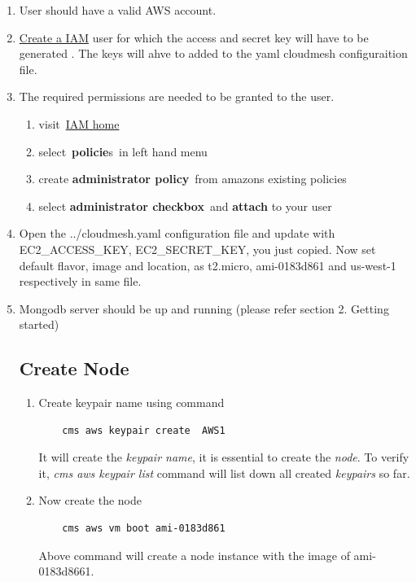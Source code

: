 \documentclass[9pt,twocolumn,twoside]{../../styles/osajnl}
\begin{document}
\begin{enumerate}
	\item User should have a valid AWS account.
	\item \href{https://console.aws.amazon.com/iam/home?#/users}{Create a IAM}  user for which the access and secret key will have to be generated \cite{www-attach-policy}. The keys will ahve to added to the yaml cloudmesh configuraition file.
	
	\item The required permissions are needed to be granted to the user.
		\begin{enumerate}
			
			\item visit \href{https://console.aws.amazon.com/iam/home} {IAM home}
			\item select \textbf{policie}s in left hand menu
			\item create \textbf{administrator policy} from amazons existing policies
			\item select \textbf{administrator checkbox} and \textbf{attach} to your user
		\end{enumerate}
		
	\item Open the ../cloudmesh.yaml configuration file and update with EC2\_ACCESS\_KEY, EC2\_SECRET\_KEY, you just copied. Now set default flavor, image and location, as t2.micro, ami-0183d861 and us-west-1 respectively in same file.
	\item Mongodb server should be up and running (please refer section 2. Getting started)

\subsection{Create Node}

\begin{enumerate}
	\item Create keypair name using command
	
	\begin{verbatim}
	cms aws keypair create  AWS1
	\end{verbatim}
	
	It will create the \textit{keypair name}, it is essential to create the \textit{node}. To verify it, \textit{cms aws keypair list} command will list down all created \textit{keypairs} so far.
	
	\item Now create the node 
	
	\begin{verbatim}
	cms aws vm boot ami-0183d861
	\end{verbatim}
	
	Above command will create a node instance with the image of ami-0183d8661.

\end{enumerate}	
	
\end{enumerate}
\end{document}
